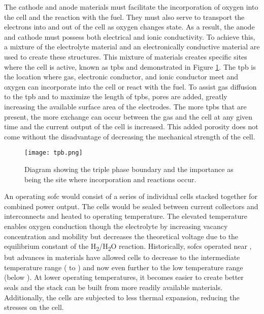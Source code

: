     The cathode and anode materials must facilitate the incorporation of oxygen into the cell and the reaction with the fuel.
    They must also serve to transport the electrons into and out of the cell as oxygen changes state.
    As a result, the anode and cathode must possess both electrical and ionic conductivity.
    To achieve this, a mixture of the electrolyte material and an electronically conductive material are used to create these structures.
    This mixture of materials creates specific sites where the cell is active, known as \glspl{tpb} and demonstrated in Figure \ref{fig:tpb}.
    The \gls{tpb} is the location where gas, electronic conductor, and ionic conductor meet and oxygen can incorporate into the cell or react with the fuel.
    To assist gas diffusion to the \gls{tpb} and to maximize the length of \glspl{tpb}, pores are added, greatly increasing the available surface area of the electrodes.
    The more \glspl{tpb} that are present, the more exchange can occur between the gas and the cell at any given time and the current output of the cell is increased.
    This added porosity does not come without the disadvantage of decreasing the mechanical strength of the cell.\cite{Pihlatie2009,Laurencin2010}
    \begin{figure}[p]
      \centering
      \texttt{[image: tpb.png]}
      \caption[Diagram showing the triple phase boundary and the importance as being the site where incorporation and reactions occur.]{Diagram showing the triple phase boundary and the importance as being the site where incorporation and reactions occur.\cite{Wachsman2011a}}\label{fig:tpb}
    \end{figure}

    An operating \gls{sofc} would consist of a series of individual cells stacked together for combined power output.
    The cells would be sealed between current collectors and interconnects and heated to operating temperature.
    The elevated temperature enables oxygen conduction though the electrolyte by increasing vacancy concentration and mobility but decreases the theoretical voltage due to the equilibrium constant of the H\textsubscript{2}/H\textsubscript{2}O reaction.
    Historically, \glspl{sofc} operated near , but advances in materials have allowed cells to decrease to the intermediate temperature range ( to ) and now even further to the low temperature range (below ).\cite{Wachsman2011a}
    At lower operating temperatures, it becomes easier to create better seals and the stack can be built from more readily available materials.%
    Additionally, the cells are subjected to less thermal expansion, reducing the stresses on the cell.

